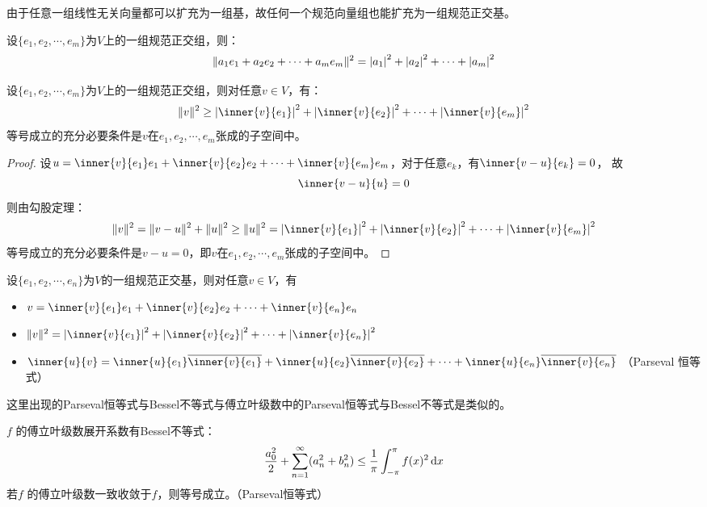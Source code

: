 由于任意一组线性无关向量都可以扩充为一组基，故任何一个规范向量组也能扩充为一组规范正交基。

\begin{corollary}
    设\(\{e_1, e_2, \cdots, e_m\}\)为\(V\)上的一组规范正交组，则：\[
        \lVert a_1 e_1 + a_2 e_2 + \cdots + a_m e_m\rVert^{2} =
        \left|a_1\right|^{2} + \left|a_2\right|^{2} + \cdots + \left|a_m\right|^{2}
    \]
\end{corollary}

\begin{theorem}[Bessel不等式]
    设\(\{e_1, e_2, \cdots, e_m\}\)为\(V\)上的一组规范正交组，则对任意\(v \in V\)，有：
    \[
        \norm{v}^{2} \geq \abs{\inner{v}{e_1}}^{2} +
        \abs{\inner{v}{e_2}}^{2} + \cdots + \abs{\inner{v}{e_m}}^{2}
    \]
    等号成立的充分必要条件是\(v\)在\(e_1, e_2, \cdots, e_m\)张成的子空间中。
\end{theorem}

\begin{proof}
    设\(u = \inner{v}{e_1} e_1 + \inner{v}{e_2} e_2 + \cdots +
    \inner{v}{e_m} e_m\)，对于任意\(e_{k}\)，有\(\inner{v-u}{e_k} = 0\)，
    故\[
        \inner{v-u}{u} = 0
    \]
    则由勾股定理：
    \[
        \norm{v}^{2} = \norm{v-u}^{2} + \norm{u}^{2} \geq
        \norm{u}^{2} = \abs{\inner{v}{e_1}}^{2} +
        \abs{\inner{v}{e_2}}^{2} + \cdots + \abs{\inner{v}{e_m}}^{2}
    \]
    等号成立的充分必要条件是\(v-u = 0\)，即\(v\)在\(e_1, e_2, \cdots, e_m\)张成的子空间中。
\end{proof}

\begin{corollary}[向量的规范正交基表示]
    设\(\{e_1, e_2, \cdots, e_n\}\)为\(V\)的一组规范正交基，则对任意\(v \in V\)，有
    \begin{itemize}
        \item \(v = \inner{v}{e_1} e_1 + \inner{v}{e_2} e_2 + \cdots +
            \inner{v}{e_n} e_n\)
        \item \(\norm{v}^{2} = \abs{\inner{v}{e_1}}^{2} +
            \abs{\inner{v}{e_2}} ^{2} + \cdots + \abs{\inner{v}{e_n}}^{2}\)
        \item \(\inner{u}{v} = \inner{u}{e_1} \conj{\inner{v}{e_1}} +
                \inner{u}{e_2} \conj{\inner{v}{e_2}} + \cdots + \inner{u}{e_n}
            \conj{\inner{v}{e_n}}\) （Parseval 恒等式）
    \end{itemize}
\end{corollary}

这里出现的Parseval恒等式与Bessel不等式与傅立叶级数中的Parseval恒等式与Bessel不等式是类似的。
\begin{note}
    \(f\) 的傅立叶级数展开系数有Bessel不等式：
    \[
        \frac{a_{0}^{2}}{2} + \sum_{n=1}^{\infty} (a_n^2 + b_n^2) \leq
        \frac{1}{\pi} \int_{-\pi}^{\pi} f (x)^{2} \d{x}
    \]
    若\(f\) 的傅立叶级数一致收敛于\(f\)，则等号成立。（Parseval恒等式）
\end{note}

